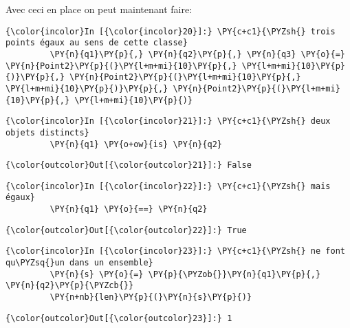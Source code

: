     Avec ceci en place on peut maintenant faire:

    \begin{Verbatim}[commandchars=\\\{\}]
{\color{incolor}In [{\color{incolor}20}]:} \PY{c+c1}{\PYZsh{} trois points égaux au sens de cette classe}
         \PY{n}{q1}\PY{p}{,} \PY{n}{q2}\PY{p}{,} \PY{n}{q3} \PY{o}{=} \PY{n}{Point2}\PY{p}{(}\PY{l+m+mi}{10}\PY{p}{,} \PY{l+m+mi}{10}\PY{p}{)}\PY{p}{,} \PY{n}{Point2}\PY{p}{(}\PY{l+m+mi}{10}\PY{p}{,} \PY{l+m+mi}{10}\PY{p}{)}\PY{p}{,} \PY{n}{Point2}\PY{p}{(}\PY{l+m+mi}{10}\PY{p}{,} \PY{l+m+mi}{10}\PY{p}{)}
\end{Verbatim}


    \begin{Verbatim}[commandchars=\\\{\}]
{\color{incolor}In [{\color{incolor}21}]:} \PY{c+c1}{\PYZsh{} deux objets distincts}
         \PY{n}{q1} \PY{o+ow}{is} \PY{n}{q2}
\end{Verbatim}


\begin{Verbatim}[commandchars=\\\{\}]
{\color{outcolor}Out[{\color{outcolor}21}]:} False
\end{Verbatim}
            
    \begin{Verbatim}[commandchars=\\\{\}]
{\color{incolor}In [{\color{incolor}22}]:} \PY{c+c1}{\PYZsh{} mais égaux}
         \PY{n}{q1} \PY{o}{==} \PY{n}{q2}
\end{Verbatim}


\begin{Verbatim}[commandchars=\\\{\}]
{\color{outcolor}Out[{\color{outcolor}22}]:} True
\end{Verbatim}
            
    \begin{Verbatim}[commandchars=\\\{\}]
{\color{incolor}In [{\color{incolor}23}]:} \PY{c+c1}{\PYZsh{} ne font qu\PYZsq{}un dans un ensemble}
         \PY{n}{s} \PY{o}{=} \PY{p}{\PYZob{}}\PY{n}{q1}\PY{p}{,} \PY{n}{q2}\PY{p}{\PYZcb{}}
         \PY{n+nb}{len}\PY{p}{(}\PY{n}{s}\PY{p}{)}
\end{Verbatim}


\begin{Verbatim}[commandchars=\\\{\}]
{\color{outcolor}Out[{\color{outcolor}23}]:} 1
\end{Verbatim}
            
